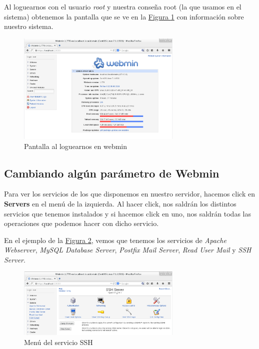\documentclass[10pt,a4paper,spanish]{article}
\numberwithin{equation}{section} %
\numberwithin{figure}{section} %
\numberwithin{table}{section} %
\begin{document}
Al loguearnos con el usuario \textit{root} y nuestra conseña root (la que usamos en el sistema) obtenemos la pantalla que se ve en la \hyperref[logwebmin]{Figura \ref*{logwebmin}} con información sobre nuestro sistema.

\begin{figure}[!h]
    \centering
    \includegraphics[width=0.7\textwidth]{30}
    \caption{Pantalla al loguearnos en webmin}
    \label{logwebmin}
\end{figure}

\subsection{Cambiando algún parámetro de Webmin}
Para ver los servicios de los que disponemos en nuestro servidor, hacemos click en \textbf{Servers} en el menú de la izquierda. Al hacer click, nos saldrán los distintos servicios que tenemos instalados y si hacemos click en uno, nos saldrán todas las operaciones que podemos hacer con dicho servicio. 

En el ejemplo de la \hyperref[sshwebmin]{Figura \ref*{sshwebmin}}, vemos que tenemos los servicios de \textit{Apache Webserver}, \textit{MySQL Database Server}, \textit{Postfix Mail Server}, \textit{Read User Mail} y \textit{SSH Server}.

\begin{figure}[!h]
    \centering
    \includegraphics[width=0.7\textwidth]{31}
    \caption{Menú del servicio SSH}
    \label{sshwebmin}
\end{figure}
\end{document}
